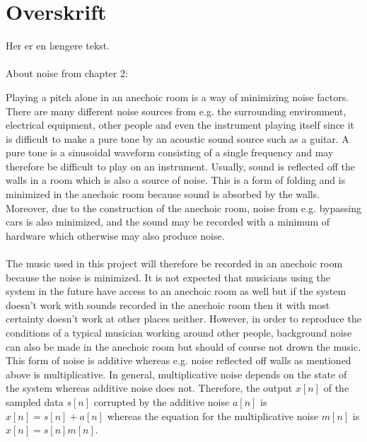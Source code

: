 \chapter{Overskrift} \label{ch4}

%
Her er en længere tekst.\\\\
About noise from chapter 2: \textregistered

Playing a pitch alone in an anechoic room is a way of minimizing noise factors. There are many different noise sources from e.g. the surrounding environment, electrical equipment, other people and even the instrument playing itself since it is difficult to make a pure tone by an acoustic sound source such as a guitar. A pure tone is a sinusoidal waveform consisting of a single frequency and may therefore be difficult to play on an instrument. \cite{AcousticNoise} Usually, sound is reflected off the walls in a room which is also a source of noise. This is a form of folding and is minimized in the anechoic room because sound is absorbed by the walls. Moreover, due to the construction of the anechoic room, noise from e.g. bypassing cars is also minimized, and the sound may be recorded with a minimum of hardware which otherwise may also produce noise.
\\ \\
The music used in this project will therefore be recorded in an anechoic room because the noise is minimized. It is not expected that musicians using the system in the future have access to an anechoic room as well but if the system doesn't work with sounds recorded in the anechoic room then it with most certainty doesn't work at other places neither. However, in order to reproduce the conditions of a typical musician working around other people, background noise can also be made in the anechoic room but should of course not drown the music. This form of noise is additive whereas e.g. noise reflected off walls as mentioned above is multiplicative. In general, multiplicative noise depends on the state of the system whereas additive noise does not. Therefore, the output $x[n]$ of the sampled data $s[n]$ corrupted by the additive noise $a[n]$ is $x[n] = s[n] + a[n]$ whereas the equation for the multiplicative noise $m[n]$ is $x[n] = s[n]m[n]$.